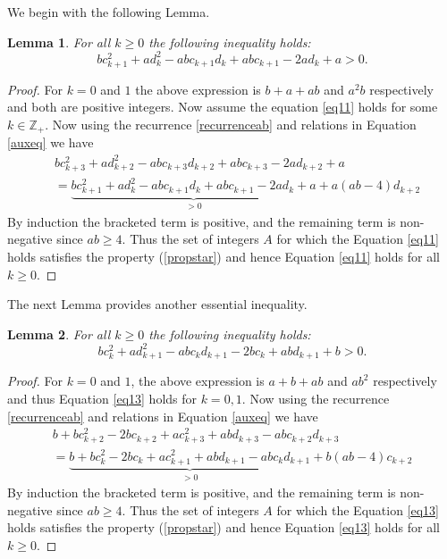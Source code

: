 \documentclass[12pt,reqno]{amsart}
\theoremstyle{plain}
\newtheorem{lem}{Lemma}
\theoremstyle{definition}
\theoremstyle{remark}
\newcommand\bz{\mathbb Z}
\begin{document}
We begin with the following Lemma. 
\begin{lem}\label{lem21}
    For all $k\geq 0$ the following inequality holds:
    \begin{equation}\label{eq11}
        bc_{k+1}^2+ad_{k}^2-abc_{k+1}d_{k}+abc_{k+1}-2ad_{k}+a> 0.
    \end{equation}
\end{lem}
\begin{proof}
    For $k=0$ and $1$ the above expression is $b+a+ab$ and $a^2b$ respectively and both are positive integers. Now assume the equation \ref{eq11} holds for some $k\in \bz_+.$ Now using the recurrence \ref{recurrenceab} and relations in Equation \ref{auxeq} we have 
    \begin{align*}
        & bc_{k+3}^2+ad_{k+2}^2-abc_{k+3}d_{k+2}+abc_{k+3}-2ad_{k+2}+a\\&=\underbrace{bc_{k+1}^2+ad_{k}^2-abc_{k+1}d_{k}+abc_{k+1}-2ad_{k}+a}_{>0}+a(ab-4)d_{k+2}
    \end{align*}
        By induction the bracketed term is positive, and the remaining term is non-negative since $ab\geq 4$.  Thus the set of integers $A$ for which the Equation \ref{eq11} holds satisfies the property (\ref{propstar}) and hence Equation \ref{eq11} holds for all $k\geq 0.$
\end{proof}
The next Lemma provides another essential inequality. %
\begin{lem}\label{lem22}
    For all $k\geq 0$ the following inequality holds:
    \begin{equation}\label{eq13}
        bc_k^2+ad_{k+1}^2-abc_kd_{k+1}-2bc_k+abd_{k+1}+b> 0.
    \end{equation}
\end{lem}
\begin{proof}
    For $k=0$ and $1$, the above expression is $a+b+ab$ and $ab^2$ respectively and thus Equation \ref{eq13} holds for $k=0,1.$ Now using the recurrence \ref{recurrenceab} and relations in Equation \ref{auxeq} we have 
    \begin{align*}
        &b+bc_{k+2}^2-2bc_{k+2}+ac_{k+3}^2+abd_{k+3}-abc_{k+2}d_{k+3}\\&=\underbrace{b+bc_k^2-2bc_k+ac_{k+1}^2+abd_{k+1}-abc_kd_{k+1}}_{>0}+b(ab-4)c_{k+2}&
    \end{align*}
 By induction the bracketed term is positive, and the remaining term is non-negative since $ab\geq 4$.  Thus the set of integers $A$ for which the Equation \ref{eq13} holds satisfies the property (\ref{propstar}) and hence Equation \ref{eq13} holds for all $k\geq 0.$  
\end{proof}
\end{document}
